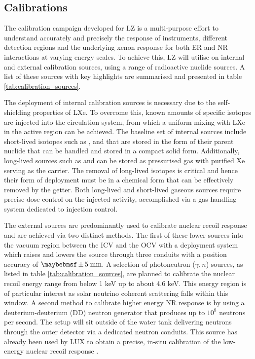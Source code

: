 \subsection{Calibrations}
\label{subsec:calibrations}

The calibration campaign developed for LZ is a multi-purpose effort to understand accurately and precisely the response of instruments, different detection regions and the underlying xenon response for both ER and NR interactions at varying energy scales. To achieve this, LZ will utilise on internal and external calibration sources, using a range of radioactive nuclide sources. A list of these sources with key highlights are summarised and presented in table \ref{tab:calibration_sources}.

The deployment of internal calibration sources is necessary due to the self-shielding properties of LXe. To overcome this, known amounts of specific isotopes are injected into the circulation system, from which a uniform mixing with LXe in the active region can be achieved. The baseline set of internal sources include short-lived isotopes such as \KrETm{}, \XeOTOm{} and \RnTTZ{} that are stored in the form of their parent nuclide that can be handled and stored in a compact solid form. Additionally, long-lived sources such as \HT{} and \COF{} can be stored as pressurised gas with purified Xe serving as the carrier. The removal of long-lived isotopes is critical and hence their form of deployment must be in a chemical form that can be effectively removed by the getter. Both long-lived and short-lived gaseous sources require precise dose control on the injected activity, accomplished via a gas handling system dedicated to injection control.

The external sources are predominantly used to calibrate nuclear recoil response and are achieved via two distinct methods. The first of these lower sources into the vacuum region between the ICV and the OCV with a deployment system which raises and lowers the source through three conduits with a position accuracy of $\pm5 \; \MathText{mm}$. A selection of photoneutron ($\gamma, n$) sources, as listed in table \ref{tab:calibration_sources}, are planned to calibrate the nuclear recoil energy range from below 1 keV up to about 4.6 keV. This energy region is of particular interest as \BE{} solar neutrino coherent scattering falls within this window. A second method to calibrate higher energy NR response is by using a deuterium-deuterium (DD) neutron generator that produces up to $10^{8}$ neutrons per second. The setup will sit outside of the water tank delivering neutrons through the outer detector via a dedicated neutron conduits. This source has already been used by LUX to obtain a precise, in-situ calibration of the low-energy nuclear recoil response \cite{lux_dd}.

